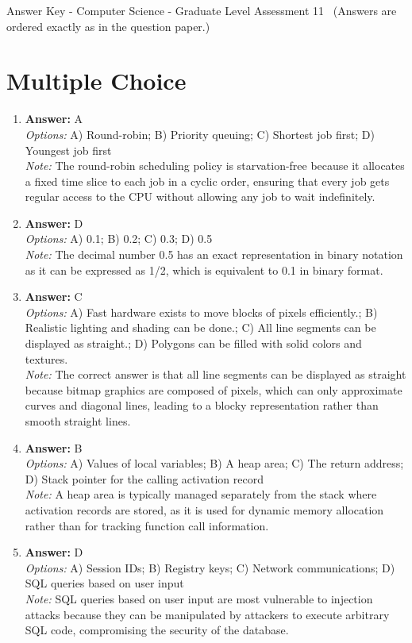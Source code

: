 \documentclass[12pt]{article}
\begin{document}
\begin{center}
Answer Key - Computer Science - Graduate Level Assessment 11 \
\small (Answers are ordered exactly as in the question paper.)
\end{center}

\section*{Multiple Choice}
\begin{enumerate}[label=\arabic*.]
\item \textbf{Answer:} A
\\ \textit{Options:} A) Round-robin; B) Priority queuing; C) Shortest job first; D) Youngest job first
\\ \textit{Note:} The round-robin scheduling policy is starvation-free because it allocates a fixed time slice to each job in a cyclic order, ensuring that every job gets regular access to the CPU without allowing any job to wait indefinitely.
\item \textbf{Answer:} D
\\ \textit{Options:} A) 0.1; B) 0.2; C) 0.3; D) 0.5
\\ \textit{Note:} The decimal number 0.5 has an exact representation in binary notation as it can be expressed as 1/2, which is equivalent to 0.1 in binary format.
\item \textbf{Answer:} C
\\ \textit{Options:} A) Fast hardware exists to move blocks of pixels efficiently.; B) Realistic lighting and shading can be done.; C) All line segments can be displayed as straight.; D) Polygons can be filled with solid colors and textures.
\\ \textit{Note:} The correct answer is that all line segments can be displayed as straight because bitmap graphics are composed of pixels, which can only approximate curves and diagonal lines, leading to a blocky representation rather than smooth straight lines.
\item \textbf{Answer:} B
\\ \textit{Options:} A) Values of local variables; B) A heap area; C) The return address; D) Stack pointer for the calling activation record
\\ \textit{Note:} A heap area is typically managed separately from the stack where activation records are stored, as it is used for dynamic memory allocation rather than for tracking function call information.
\item \textbf{Answer:} D
\\ \textit{Options:} A) Session IDs; B) Registry keys; C) Network communications; D) SQL queries based on user input
\\ \textit{Note:} SQL queries based on user input are most vulnerable to injection attacks because they can be manipulated by attackers to execute arbitrary SQL code, compromising the security of the database.
\end{enumerate}
\end{document}
